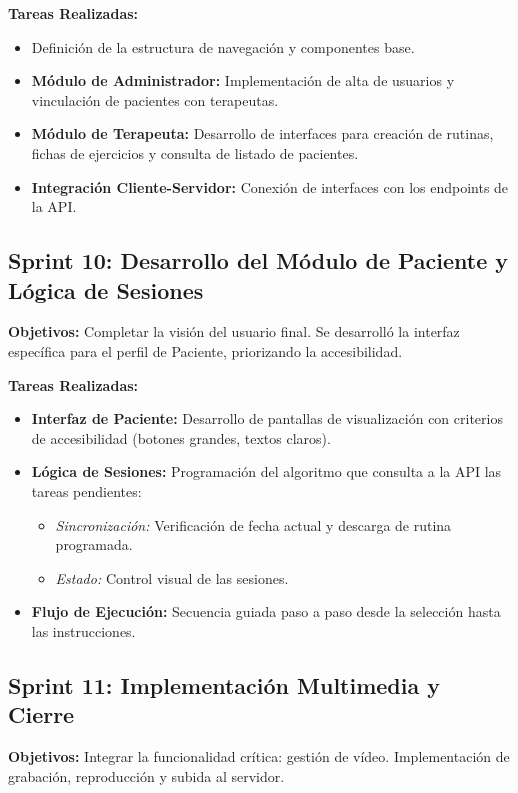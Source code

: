 \textbf{Tareas Realizadas:}
\begin{itemize}
    \item Definición de la estructura de navegación y componentes base.
    \item \textbf{Módulo de Administrador:} Implementación de alta de usuarios y vinculación de pacientes con terapeutas.
    \item \textbf{Módulo de Terapeuta:} Desarrollo de interfaces para creación de rutinas, fichas de ejercicios y consulta de listado de pacientes.
    \item \textbf{Integración Cliente-Servidor:} Conexión de interfaces con los endpoints de la API.
\end{itemize}

\subsection{Sprint 10: Desarrollo del Módulo de Paciente y Lógica de Sesiones}
\textbf{Objetivos:} Completar la visión del usuario final. Se desarrolló la interfaz específica para el perfil de Paciente, priorizando la accesibilidad.

\textbf{Tareas Realizadas:}
\begin{itemize}
    \item \textbf{Interfaz de Paciente:} Desarrollo de pantallas de visualización con criterios de accesibilidad (botones grandes, textos claros).
    \item \textbf{Lógica de Sesiones:} Programación del algoritmo que consulta a la API las tareas pendientes:
    \begin{itemize}
        \item \textit{Sincronización:} Verificación de fecha actual y descarga de rutina programada.
        \item \textit{Estado:} Control visual de las sesiones.
    \end{itemize}
    \item \textbf{Flujo de Ejecución:} Secuencia guiada paso a paso desde la selección hasta las instrucciones.
\end{itemize}

\subsection{Sprint 11: Implementación Multimedia y Cierre}
\textbf{Objetivos:} Integrar la funcionalidad crítica: gestión de vídeo. Implementación de grabación, reproducción y subida al servidor.

